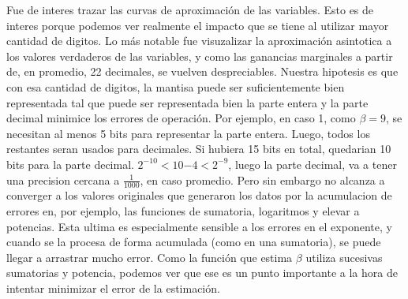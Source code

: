 Fue de interes trazar las curvas de aproximaci\'on de las variables. Esto es de interes porque podemos ver 
realmente el impacto que se tiene al utilizar mayor cantidad de digitos. Lo m\'as notable fue visuzalizar la 
aproximaci\'on asintotica a los valores verdaderos de las variables, y como las ganancias marginales a partir de,
en promedio, 22 decimales, se vuelven despreciables. Nuestra hipotesis es que con esa cantidad de digitos, la mantisa
puede ser suficientemente bien representada tal que puede ser representada bien la parte entera y la parte decimal 
minimice los errores de operaci\'on. Por ejemplo, en caso 1, como $\beta = 9$, se necesitan al menos 5 bits para representar la parte entera.
Luego, todos los restantes seran usados para decimales. Si hubiera 15 bits en total, quedarian 10 bits para la parte decimal. $2^{-10}<10{-4}<2^{-9}$, luego
la parte decimal, va a tener una precision cercana a $\frac{1}{1000}$, en caso promedio. Pero sin embargo no alcanza
a converger a los valores originales que generaron los datos por la acumulacion de errores en, por ejemplo, las funciones
de sumatoria, logaritmos y elevar a potencias. Esta ultima es especialmente sensible a los errores en el exponente, y cuando 
se la procesa de forma acumulada (como en una sumatoria), se puede llegar a arrastrar mucho error. Como la funci\'on que estima
$\beta$ utiliza sucesivas sumatorias y potencia, podemos ver que ese es un punto importante a la hora de intentar minimizar el error de 
la estimaci\'on.
